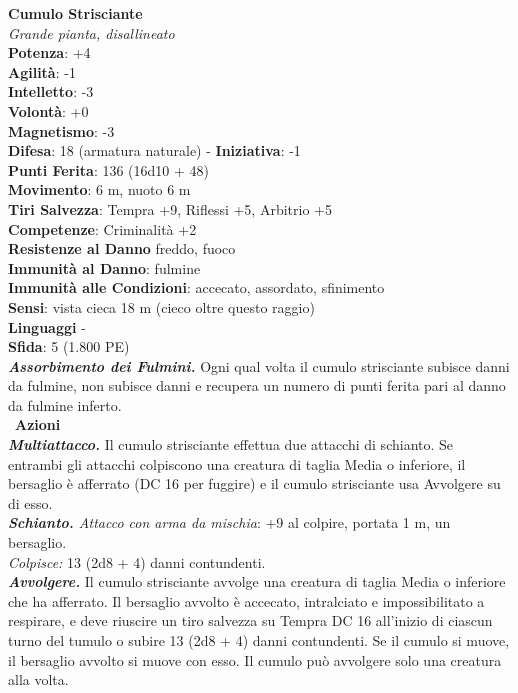 \begin{multicols}{2}
\medskip\textbf{Cumulo Strisciante}\\
\emph{Grande pianta, disallineato}\\
\textbf{Potenza}: +4\\
\textbf{Agilità}: -1\\
\textbf{Intelletto}: -3\\
\textbf{Volontà}: +0\\
\textbf{Magnetismo}: -3\\
\textbf{Difesa}: 18 (armatura naturale) - \textbf{Iniziativa}: -1\\
\textbf{Punti Ferita}: 136 (16d10 + 48)\\
\textbf{Movimento}: 6 m, nuoto 6 m\\
\textbf{Tiri Salvezza}: Tempra +9, Riflessi +5, Arbitrio +5\\
\textbf{Competenze}: Criminalità +2\\
\textbf{Resistenze al Danno} freddo, fuoco\\
\textbf{Immunità al Danno}: fulmine\\
\textbf{Immunità alle Condizioni}: accecato, assordato, sfinimento\\
\textbf{Sensi}: vista cieca 18 m (cieco oltre questo raggio)\\
\textbf{Linguaggi} -\\
\textbf{Sfida}: 5 (1.800 PE)\smallskip\\
\emph{\textbf{Assorbimento dei Fulmini.}} Ogni qual volta il cumulo strisciante subisce danni da fulmine, non subisce danni e recupera un numero di punti ferita pari al danno da fulmine inferto.\\\
\smallskip\textbf{Azioni}\\
\emph{\textbf{Multiattacco.}} Il cumulo strisciante effettua due attacchi di schianto. Se entrambi gli attacchi colpiscono una creatura di taglia Media o inferiore, il bersaglio è afferrato (DC  16 per fuggire) e il cumulo strisciante usa Avvolgere su di esso.\\
\emph{\textbf{Schianto.} Attacco con arma da mischia}: +9 al colpire, portata 1 m, un bersaglio.\\
\emph{Colpisce:} 13 (2d8 + 4) danni contundenti.\\
\emph{\textbf{Avvolgere.}} Il cumulo strisciante avvolge una creatura di taglia Media o inferiore che ha afferrato. Il bersaglio avvolto è accecato, intralciato e impossibilitato a respirare, e deve riuscire un tiro salvezza su Tempra DC  16 all'inizio di ciascun turno del tumulo o subire 13 (2d8 + 4) danni contundenti. Se il cumulo si muove, il bersaglio avvolto si muove con esso. Il cumulo può avvolgere solo una creatura alla volta.\\

\end{multicols}
